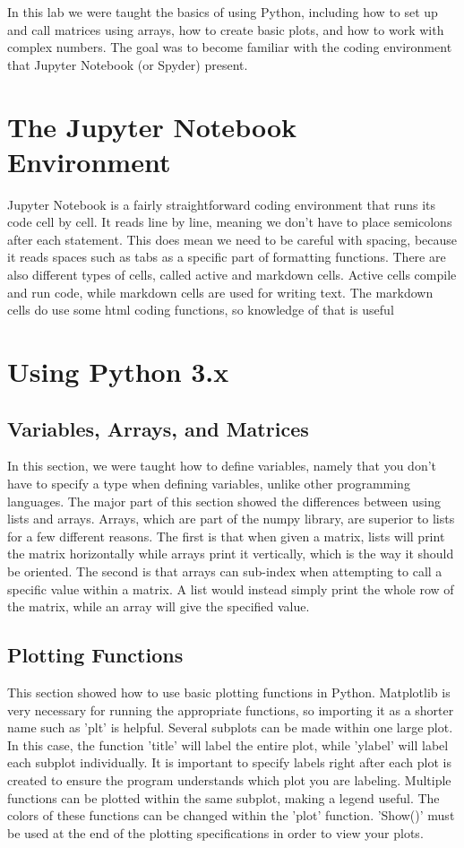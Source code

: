 \documentclass[12pt]{report}
\begin{document}
In this lab we were taught the basics of using Python, including how to set up and call matrices using arrays, how to create basic plots, and how to work with complex numbers. The goal was to become familiar with the coding environment that Jupyter Notebook (or Spyder) present.

\section{The Jupyter Notebook Environment}

Jupyter Notebook is a fairly straightforward coding environment that runs its code cell by cell. It reads line by line, meaning we don't have to place semicolons after each statement. This does mean we need to be careful with spacing, because it reads spaces such as tabs as a specific part of formatting functions. There are also different types of cells, called active and markdown cells. Active cells compile and run code, while markdown cells are used for writing text. The markdown cells do use some html coding functions, so knowledge of that is useful

\section{Using Python 3.x}
 \subsection{Variables, Arrays, and Matrices}
 
 In this section, we were taught how to define variables, namely that you don't have to specify a type when defining variables, unlike other programming languages. The major part of this section showed the differences between using lists and arrays. Arrays, which are part of the numpy library, are superior to lists for a few different reasons. The first is that when given a matrix, lists will print the matrix horizontally while arrays print it vertically, which is the way it should be oriented. The second is that arrays can sub-index when attempting to call a specific value within a matrix. A list would instead simply print the whole row of the matrix, while an array will give the specified value. 
 
 \newpage
 \subsection{Plotting Functions}
 
 This section showed how to use basic plotting functions in Python. Matplotlib is very necessary for running the appropriate functions, so importing it as a shorter name such as 'plt' is helpful. Several subplots can be made within one large plot. In this case, the function 'title' will label the entire plot, while 'ylabel' will label each subplot individually. It is important to specify labels right after each plot is created to ensure the program understands which plot you are labeling. Multiple functions can be plotted within the same subplot, making a legend useful. The colors of these functions can be changed within the 'plot' function. 'Show()' must be used at the end of the plotting specifications in order to view your plots. 
 
\end{document}
